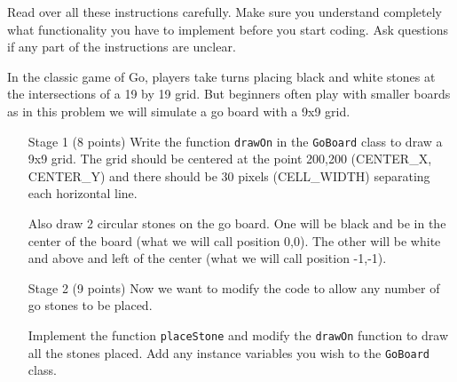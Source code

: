 \documentclass[12pt,twoside]{article}
\newcommand{\code}[1]{\texttt{#1}}
\begin{document}
Read over all these instructions carefully.  Make sure you understand completely what functionality you have to implement before you start coding.  Ask questions if any part of the instructions are unclear.

In the classic game of Go, players take turns placing black and white stones at the intersections of a 19 by 19 grid.  But beginners often play with smaller boards as in this problem we will simulate a go board with a 9x9 grid.

\begin{itemize}
\item[Stage 1] (8 points) Write the function \code{drawOn} in the \code{GoBoard} class to draw a 9x9 grid.  The grid should be centered at the point 200,200 (CENTER_X, CENTER_Y) and there should be 30 pixels (CELL_WIDTH) separating each horizontal line.

Also draw 2 circular stones on the go board.  One will be black and be in the center of the board (what we will call position 0,0).  The other will be white and above and left of the center (what we will call position -1,-1).

\item[Stage 2] (9 points) Now we want to modify the code to allow any number of go stones to be placed.

Implement the function \code{placeStone} and modify the \code{drawOn} function to draw all the stones placed.  Add any instance variables you wish to the \code{GoBoard} class.

\end{itemize}
\end{document}

